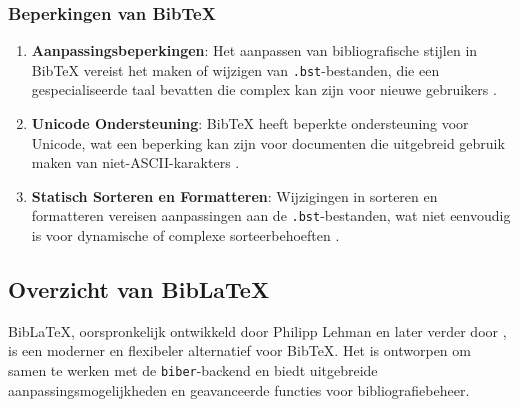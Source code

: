 \subsubsection{Beperkingen van BibTeX}
\begin{enumerate}
    \item \textbf{Aanpassingsbeperkingen}: Het aanpassen van bibliografische stijlen in BibTeX vereist het maken of wijzigen van \texttt{.bst}-bestanden, die een gespecialiseerde taal bevatten die complex kan zijn voor nieuwe gebruikers \autocite{Patashnik1988}.
    \item \textbf{Unicode Ondersteuning}: BibTeX heeft beperkte ondersteuning voor Unicode, wat een beperking kan zijn voor documenten die uitgebreid gebruik maken van niet-ASCII-karakters \autocite{Patashnik1988}.
    \item \textbf{Statisch Sorteren en Formatteren}: Wijzigingen in sorteren en formatteren vereisen aanpassingen aan de \texttt{.bst}-bestanden, wat niet eenvoudig is voor dynamische of complexe sorteerbehoeften \autocite{Patashnik1988}.
\end{enumerate}

\subsection{Overzicht van BibLaTeX}
BibLaTeX, oorspronkelijk ontwikkeld door Philipp Lehman en later verder door \textcite{Kime2024}, is een moderner en flexibeler alternatief voor BibTeX. Het is ontworpen om samen te werken met de \texttt{biber}-backend en biedt uitgebreide aanpassingsmogelijkheden en geavanceerde functies voor bibliografiebeheer.

